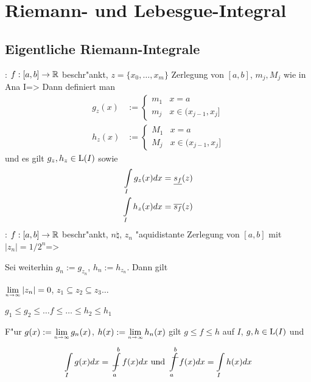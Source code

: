 \section{Riemann- und Lebesgue-Integral}
\subsection{Eigentliche Riemann-Integrale}
\theorem:
  $f:[a,b]\to\mathbb R$ beschr"ankt, $z=\{x_0,\ldots,x_m\}$ Zerlegung von $[a,b]$,
  $m_j,M_j$ wie in Ana I=>{
  Dann definiert man
  \begin{align*}
    g_z(x)&:=\begin{cases} m_1 & x=a \\ m_j & x\in(x_{j-1},x_j] \end{cases} \\
    h_z(x)&:=\begin{cases} M_1 & x=a \\ M_j & x\in(x_{j-1},x_j] \end{cases} 
    \end{align*}
  und es gilt $g_z,h_z\in{\rm L}(I)$ sowie
  \begin{align*}
    \int_I g_z(x) dx&=\lsum(z) \\
    \int_I h_z(x) dx&=\usum(z)
    \end{align*}
  }  
\theorem:
  $f:[a,b]\to\mathbb R$ beschr"ankt, $n\natural$, $z_n$ "aquidistante 
  Zerlegung von $[a,b]$ mit $|z_n|=1/2^n$=>{
  Sei weiterhin $g_n:=g_{z_n}$, $h_n:=h_{z_n}$. Dann gilt
  \begin{stmts}
    \item $\limn |z_n|=0$, $z_1\subseteq z_2\subseteq z_3\ldots$
    \item $g_1\le g_2\le\ldots f \le \ldots\le h_2\le h_1$
    \item F"ur $g(x):=\limn g_n(x)$, $h(x):=\limn h_n(x)$ gilt
      $g\le f\le h$ auf $I$, $g,h\in{\rm L}(I)$ und
      \[\int_I g(x)dx=\lint_a^b f(x) dx \text{ und }
        \uint_a^b f(x) dx=\int_I h(x) dx
        \]
    \end{stmts}
  }
